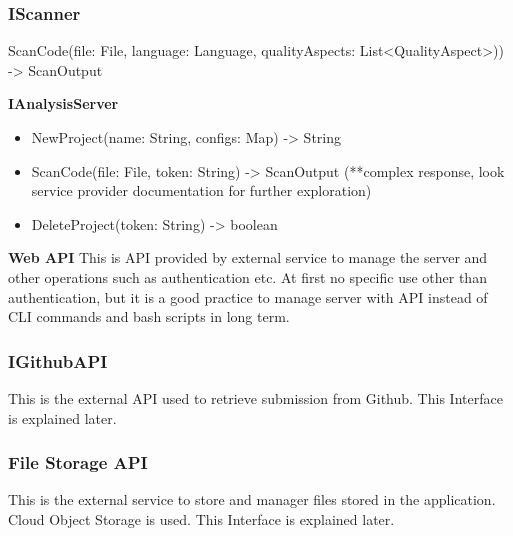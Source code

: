 \subsubsection{IScanner}
\item ScanCode(file: File, language: Language, qualityAspects: List<QualityAspect>)) -> ScanOutput
\item \textbf{IAnalysisServer}
\begin{itemize}
    \item NewProject(name: String, configs: Map) -> String
    \item ScanCode(file: File, token: String) -> ScanOutput (**complex response, look service provider documentation for further exploration)
    \item DeleteProject(token: String) -> boolean
\end{itemize}
\item \textbf{Web API}
This is API provided by external service to manage the server and other operations such as authentication etc. At first no specific use other than authentication, but it is a good practice to manage server with API instead of CLI commands and bash scripts in long term.
\subsubsection{IGithubAPI}
This is the external API used to retrieve submission from Github. This Interface is explained later.
\subsubsection{File Storage API}
This is the external service to store and manager files stored in the application. Cloud Object Storage is used. This Interface is explained later.


